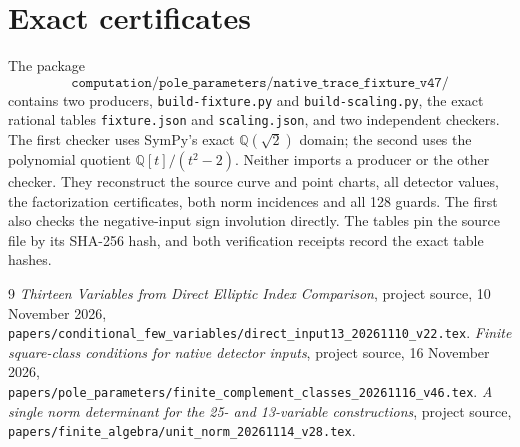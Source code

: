\documentclass[11pt,a4paper]{article}
\newcommand{\Q}{\mathbb Q}\newcommand{\Z}{\mathbb Z}
\begin{document}
\section{Exact certificates}\label{sec:certificates}

The package
\[
 \texttt{computation/pole\_parameters/native\_trace\_fixture\_v47/}
\]
contains two producers, \texttt{build-fixture.py} and
\texttt{build-scaling.py}, the exact rational tables
\texttt{fixture.json} and \texttt{scaling.json}, and two independent
checkers. The first checker uses SymPy's exact $\Q(\sqrt2)$ domain;
the second uses the polynomial quotient $\Q[t]/(t^2-2)$.
Neither imports a producer or the other checker. They reconstruct the
source curve and point charts, all detector values, the factorization
certificates, both norm incidences and all 128 guards. The first also
checks the negative-input sign involution directly. The tables pin the
source file by its SHA-256 hash, and both verification receipts record
the exact table hashes.

\begin{thebibliography}{9}
\emph{Thirteen Variables from Direct Elliptic Index Comparison},
project source, 10 November 2026,
\nolinkurl{papers/conditional_few_variables/direct_input13_20261110_v22.tex}.
\emph{Finite square-class conditions for native detector inputs},
project source, 16 November 2026,
\nolinkurl{papers/pole_parameters/finite_complement_classes_20261116_v46.tex}.
\emph{A single norm determinant for the 25- and 13-variable constructions},
project source,
\nolinkurl{papers/finite_algebra/unit_norm_20261114_v28.tex}.
\end{thebibliography}
\end{document}
